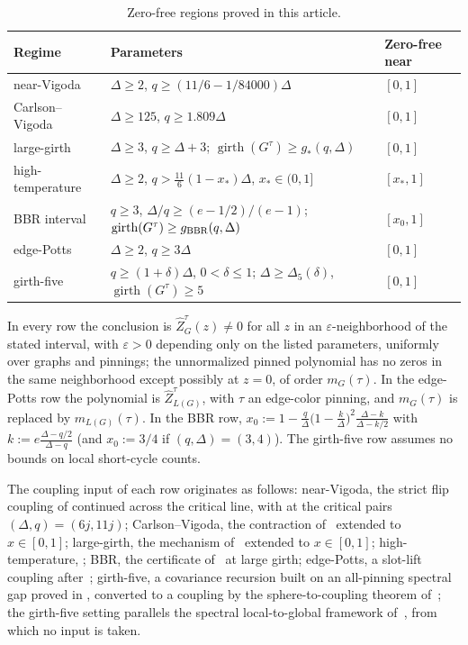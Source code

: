 \documentclass[11pt,reqno]{article}
\theoremstyle{plain}
\theoremstyle{definition}
\theoremstyle{remark}
\newcommand{\eps}{\varepsilon}
\newcommand{\Deg}{\Delta}                        %
\newcommand{\nZpin}[2]{\widehat Z_{#1}^{#2}}
\begin{document}
\begin{table}[H]
\centering
\small
\setlength{\tabcolsep}{7pt}
\renewcommand{\arraystretch}{1.22}
\begin{tabular}{@{}lll@{}}
\toprule
Regime & Parameters & Zero-free near \\
\midrule
near-Vigoda
  & \(\Deg\ge2\), \(q\ge(11/6-1/84000)\Deg\)
  & \([0,1]\) \\
Carlson--Vigoda
  & \(\Deg\ge125\), \(q\ge1.809\Deg\)
  & \([0,1]\) \\
large-girth
  & \(\Deg\ge3\), \(q\ge\Deg+3\); \(\operatorname{girth}(G^\tau)\ge g_*(q,\Deg)\)
  & \([0,1]\) \\
high-temperature
  & \(\Deg\ge2\), \(q>\frac{11}{6}(1-x_*)\Deg\), \(x_*\in(0,1]\)
  & \([x_*,1]\) \\
BBR interval
  & \(q\ge3\), \(\Deg/q\ge(e-1/2)/(e-1)\); \(\operatorname{girth}(G^\tau)\ge g_{\rm BBR}(q,\Deg)\)
  & \([x_0,1]\) \\
edge-Potts
  & \(\Deg\ge2\), \(q\ge3\Deg\)
  & \([0,1]\) \\
girth-five
  & \(q\ge(1+\delta)\Deg\), \(0<\delta\le1\); \(\Deg\ge\Deg_5(\delta)\), \(\operatorname{girth}(G^\tau)\ge5\)
  & \([0,1]\) \\
\bottomrule
\end{tabular}
\smallskip

\parbox{0.97\textwidth}{\raggedright\scriptsize
In every row the conclusion is \(\nZpin{G}{\tau}(z)\ne0\) for all \(z\)
in an \(\eps\)-neighborhood of the stated interval, with \(\eps>0\)
depending only on the listed parameters, uniformly over graphs and
pinnings; the unnormalized pinned polynomial has no zeros in the same
neighborhood except possibly at \(z=0\), of order \(m_G(\tau)\).
In the edge-Potts row the polynomial is \(\nZpin{L(G)}{\tau}\), with
\(\tau\) an edge-color pinning, and \(m_G(\tau)\) is replaced by
\(m_{L(G)}(\tau)\).  In the BBR row,
\(x_0:=1-\frac q\Deg\bigl(1-\frac k\Deg\bigr)^{\!2}
\frac{\Deg-k}{\Deg-k/2}\) with \(k:=e\frac{\Deg-q/2}{\Deg-q}\) (and
\(x_0:=3/4\) if \((q,\Deg)=(3,4)\)).  The girth-five row assumes no
bounds on local short-cycle counts.}
\caption{Zero-free regions proved in this article.}
\label{tab:appendix-extensions}
\end{table}

The coupling input of each row originates as follows: near-Vigoda, the
strict flip coupling of \cite{ShaoShi2026ZeroFreeness} continued across the
critical line, with \cite[Theorem~20]{CFFGZZ2024} at the critical pairs
\((\Deg,q)=(6j,11j)\); Carlson--Vigoda, the contraction
of~\cite{CarlsonVigoda2024} extended to \(x\in[0,1]\); large-girth, the
mechanism of~\cite{CLMM2023} extended to \(x\in[0,1]\);
high-temperature, ; BBR, the certificate
of~\cite{BencsBerrekkalRegts2025Trees} at large girth; edge-Potts, a
slot-lift coupling after~\cite{CWZZ2025}; girth-five, a covariance
recursion built on an all-pinning spectral gap proved in
, converted to a coupling by the
sphere-to-coupling theorem of~\cite[Lemma~5.13]{CLMM2023}; the
girth-five setting parallels the spectral local-to-global framework
of~\cite{ChenLiu2026LocalGlobal}, from which no input is taken.
\end{document}
